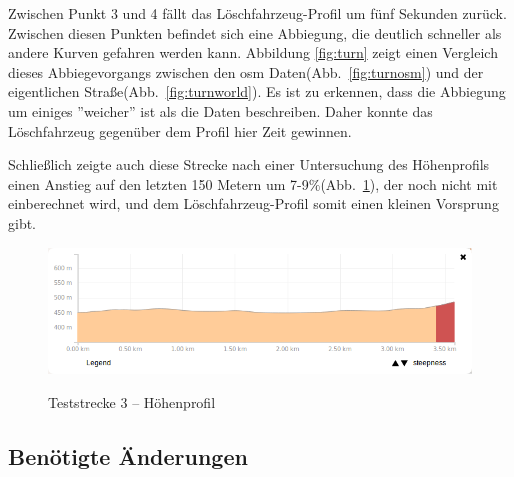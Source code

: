 Zwischen Punkt 3 und 4 fällt das Löschfahrzeug-Profil um fünf Sekunden zurück.
Zwischen diesen Punkten befindet sich eine Abbiegung, die deutlich schneller als andere Kurven gefahren werden kann.
Abbildung \ref{fig:turn} zeigt einen Vergleich dieses Abbiegevorgangs zwischen den \gls{osm} Daten(Abb.~\ref{fig:turnosm}) und der eigentlichen Straße(Abb.~\ref{fig:turnworld}).
Es ist zu erkennen, dass die Abbiegung um einiges ''weicher'' ist als die Daten beschreiben.
Daher konnte das Löschfahrzeug gegenüber dem Profil hier Zeit gewinnen.

Schließlich zeigte auch diese Strecke nach einer Untersuchung des Höhenprofils einen Anstieg auf den letzten 150 Metern um 7-9$\%$(Abb.~\ref{fig:profile2}), der noch nicht mit einberechnet wird, und dem Löschfahrzeug-Profil somit einen kleinen Vorsprung gibt.

\begin{figure}[htb]
\centering
\caption{Teststrecke 3 -- Höhenprofil}
\label{fig:profile2}
\includegraphics[width = 0.90 \textwidth]{../media/Fahrt3_Profile.png} \\
\end{figure}


\subsection{Benötigte Änderungen}

